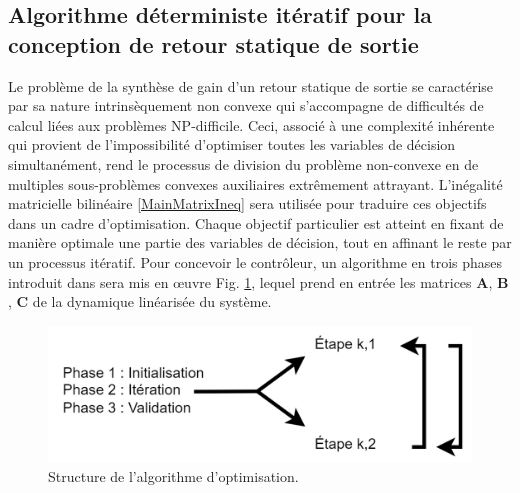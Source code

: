 \subsection{Algorithme déterministe itératif pour la conception de retour statique de sortie}
\label{3a}

Le problème de la synthèse de gain d'un retour statique de sortie se caractérise par sa nature intrinsèquement non convexe qui s'accompagne de difficultés de calcul liées aux problèmes NP-difficile. Ceci, associé à une complexité inhérente qui provient de l'impossibilité d'optimiser toutes les variables de décision simultanément, rend le processus de division du problème non-convexe en de multiples sous-problèmes convexes auxiliaires extrêmement attrayant. L'inégalité matricielle bilinéaire \eqref{MainMatrixIneq} sera utilisée pour traduire ces objectifs dans un cadre d'optimisation. Chaque objectif particulier est atteint en fixant de manière optimale une partie des variables de décision, tout en affinant le reste par un processus itératif. Pour concevoir le contrôleur, un algorithme en trois phases introduit dans \cite{Arzelier2018} sera mis en œuvre Fig. \ref{AlgoPhases}, lequel prend en entrée les matrices $\boldsymbol{A}$, $\boldsymbol{B}$, $\boldsymbol{C}$ de la dynamique linéarisée du système.

\begin{figure}[hbt]
    \centering
      \includegraphics[width=0.6\columnwidth]{figures/LMIAlgo.png}
      \vspace{-0.2cm}\caption{Structure de l'algorithme d'optimisation.}
      \label{AlgoPhases}
\end{figure} 

